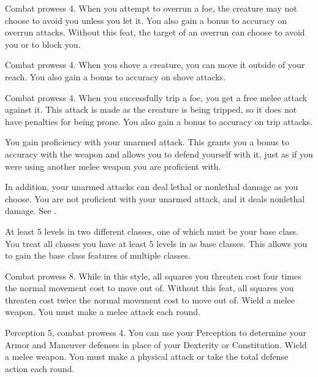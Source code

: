 \featpre Combat prowess 4.
\featben When you attempt to overrun a foe, the creature may not choose to avoid you unless you let it.
You also gain a  bonus to accuracy on overrun attacks.
Without this feat, the target of an overrun can choose to avoid you or to block you.

\featpre Combat prowess 4.
\featben When you shove a creature, you can move it outside of your reach.
You also gain a  bonus to accuracy on shove attacks.

\featpre Combat prowess 4.
\featben When you successfully trip a foe, you get a free melee attack against it.
This attack is made as the creature is being tripped, so it does not have penalties for being prone.
You also gain a  bonus to accuracy on trip attacks.

\featben You gain proficiency with your unarmed attack.
This grants you a  bonus to accuracy with the weapon and allows you to defend yourself with it, just as if you were using another melee weapon you are proficient with.

In addition, your unarmed attacks can deal lethal or nonlethal damage as you choose.
 You are not proficient with your unarmed attack, and it deals nonlethal damage. See .

\featpre At least 5 levels in two different classes, one of which must be your base class.
\featben You treat all classes you have at least 5 levels in as base classes.
This allows you to gain the base class features of multiple classes.

\featpre Combat prowess 8.
\featben While in this style, all squares you threaten cost four times the normal movement cost to move out of.
 Without this feat, all squares you threaten cost twice the normal movement cost to move out of.
\stylereq Wield a melee weapon.
You must make a melee attack each round.

\featpres Perception 5, combat prowess 4.
\featben You can use your Perception to determine your Armor and Maneuver defenses in place of your Dexterity or Constitution.
\stylereq Wield a melee weapon.
You must make a physical attack or take the total defense action each round.

